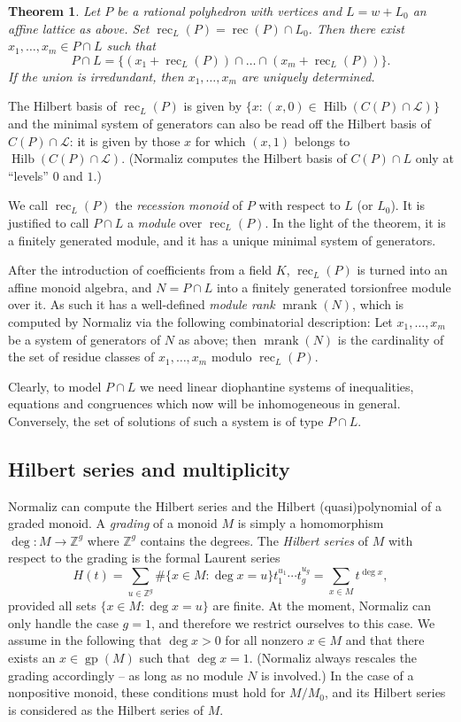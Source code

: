 \documentclass[12pt,a4paper]{scrartcl}
\newtheorem{theorem}{Theorem}
\theoremstyle{definition}
\def\ZZ{{\mathbb Z}}
\def\cL{{\mathcal L}}
\DeclareMathOperator{\gp}{gp}
\DeclareMathOperator{\rec}{rec}
\DeclareMathOperator{\mrank}{mrank}
\DeclareMathOperator{\Hilb}{Hilb}
\begin{document}
\begin{theorem}
	Let $P$ be a rational polyhedron with vertices and $L=w+L_0$ an affine lattice as above. Set $\rec_L(P)=\rec(P)\cap L_0$. Then there exist $x_1,\dots,x_m\in P\cap L$ such that
	$$
	P\cap L=\{(x_1+\rec_L(P))\cap\dots\cap(x_m+\rec_L(P))\}.
	$$
	If the union is irredundant, then $x_1,\dots,x_m$ are uniquely determined.
\end{theorem}

The Hilbert basis of $\rec_L(P)$ is given by $\{x: (x,0)\in \Hilb(C(P)\cap\cL)\}$ and the minimal system of generators can also be read off the Hilbert basis of $C(P)\cap \cL$: it is given by those $x$ for which $(x,1)$ belongs to $\Hilb(C(P)\cap\cL)$. (Normaliz computes the Hilbert basis of $C(P)\cap L$ only at ``levels'' $0$ and $1$.)

We call $\rec_L(P)$ the \emph{recession monoid} of $P$ with respect to $L$ (or $L_0$). It is justified to call $P\cap L$ a \emph{module} over $\rec_L(P)$. In the light of the theorem, it is a finitely generated module, and it has a unique minimal system of generators.

After the introduction of coefficients from a field $K$, $\rec_L(P)$ is turned into an affine monoid algebra, and $N=P\cap L$ into a finitely generated torsionfree module over it. As such it has a well-defined \emph{module rank} $\mrank(N)$, which is computed by Normaliz via the following combinatorial description: Let $x_1,\dots,x_m$ be a system of generators of $N$ as above; then $\mrank(N)$  is the cardinality of the set of residue classes of $x_1,\dots,x_m$ modulo $\rec_L(P)$.

Clearly, to model $P\cap L$ we need linear diophantine systems of inequalities, equations and congruences which now will be inhomogeneous in general. Conversely, the set of solutions of such a system is of type $P\cap L$.


\subsection{Hilbert series and multiplicity}\label{AppHilbertSeries}

Normaliz can compute the Hilbert series  and the Hilbert
(quasi)polynomial of a graded monoid. A \emph{grading} of a
monoid $M$ is simply a homomorphism $\deg:M\to\ZZ^g$ where
$\ZZ^g$ contains the degrees. The \emph{Hilbert series} of $M$
with respect to the grading is the formal Laurent series
$$
H(t)=\sum_{u\in \ZZ^g} \#\{x\in M: \deg x=u\}t_1^{u_1}\cdots t_g^{u_g}=\sum_{x\in M}t^{\deg x},
$$
provided all sets $\{x\in M: \deg x=u\}$ are finite. At the moment, Normaliz can only handle the case $g=1$, and therefore we restrict ourselves to this case. We assume in the following that $\deg x >0$ for all nonzero $x\in M$ and that there exists an $x\in\gp(M)$ such that $\deg x=1$. (Normaliz always rescales the grading accordingly -- as long as no module $N$ is involved.) In the case of a nonpositive monoid, these conditions must hold for $M/M_0$, and its Hilbert series is considered as the Hilbert series of $M$. 
\end{document}

